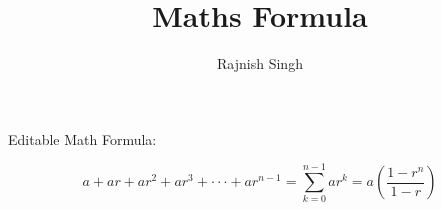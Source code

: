 \documentclass{article}
\title{Maths Formula}
\author{Rajnish Singh}
\begin{document}
        \maketitle

        Editable Math Formula:

        \[
        a+a r+a r^{2}+a r^{3}+\cdot\cdot\cdot+a r^{n-1}=\sum_{k=0}^{n-1}a r^{k}=a\left({\frac{1-r^{n}}{1-r}}\right)
        \]

        
\end{document}
